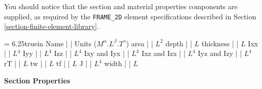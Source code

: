 \vspace{0.15 in}\noindent
You should notice that the section and material properties
components are supplied, as required by the {\tt FRAME\_2D}
element specifications described in Section \ref{section-finite-element-library}.

\begin{table}[t]
\tablewidth = 6.25truein
\begintable
Name          |                          | Units ($M^{\alpha}.L^{\beta}.T^{\gamma}$) \crthick
area          |              | $L^2$         \cr
depth         |                   | $L$           \cr
thickness     |               | $L$           \cr
Ixx           |   | $L^4$         \cr
Iyy           |   | $L^4$         \cr
Izz           |   | $L^4$         \cr
Ixy and Iyx   |   | $L^4$         \cr
Ixz and Izx   |   | $L^4$         \cr
Iyz and Izy   |   | $L^4$         \cr
rT            |                 | $L$           \cr
tw            |                       | $L$           \cr
tf            |                    | $L$           \cr
J             |                 | $L^4$         \cr
width         |                   | $L$    
\endtable
\vspace{0.01 in}
\caption{\bf Section Properties}
\label{tab: my-section-properties}
\end{table}

